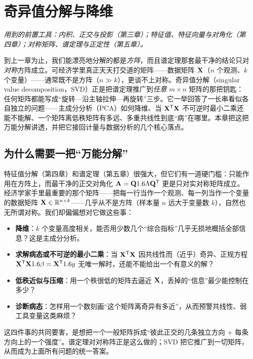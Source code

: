 \chapter{奇异值分解与降维}
\label{ch:svd}

\noindent\emph{用到的前置工具：内积、正交与投影（第三章）；特征值、特征向量与对角化（第四章）；对称矩阵、谱定理与正定性（第五章）。}
\medskip

到上一章为止，我们能漂亮地分解的都是\emph{方阵}，而且谱定理那套最干净的结论只对\emph{对称}方阵成立。可经济学里真正天天打交道的矩阵——数据矩阵 $\mathbf{X}$（$n$ 个观测、$k$ 个变量）——通常既不是方阵（$n\gg k$），更谈不上对称。奇异值分解（singular value decomposition，SVD）正是把谱定理推广到\emph{任意} $m\times n$ 矩阵的那把钥匙：任何矩阵都能写成``旋转—沿主轴拉伸—再旋转''三步。它一举回答了一长串看似各自独立的问题——主成分分析（PCA）如何降维、当 $\mathbf{X}^{\mathsf{T}}\mathbf{X}$ 不可逆时最小二乘还能不能解、一个矩阵离低秩矩阵有多远、多重共线性到底``病''在哪里。本章把这把万能分解讲透，并把它接回计量与数据分析的几个核心落点。

\section{为什么需要一把``万能分解''}
\label{sec:svd-motivation}

特征值分解（第四章）和谱定理（第五章）很强大，但它们有一道硬门槛：只能作用在方阵上，而最干净的正交对角化 $\mathbf{A}=\mathbf{Q}1.6\Lambda\mathbf{Q}^{\mathsf{T}}$ 更是只对实对称矩阵成立。经济学家手里最重要的那个矩阵——把每一行当作一个观测、每一列当作一个变量的数据矩阵 $\mathbf{X}\in\mathbb{R}^{n\times k}$——几乎从不是方阵（样本量 $n$ 远大于变量数 $k$），自然也无所谓对称。我们却偏偏想对它做这些事：

\begin{itemize}
    \item \textbf{降维}：$k$ 个变量高度相关，能否用少数几个``综合指标''几乎无损地概括全部信息？这是主成分分析。
    \item \textbf{求解病态或不可逆的最小二乘}：当 $\mathbf{X}^{\mathsf{T}}\mathbf{X}$ 因共线性而（近乎）奇异、正规方程 $\mathbf{X}^{\mathsf{T}}\mathbf{X}1.6\beta=\mathbf{X}^{\mathsf{T}}1.6 y$ 无唯一解时，还能不能给出一个有意义的解？
    \item \textbf{低秩近似与压缩}：用一个秩很低的矩阵去逼近 $\mathbf{X}$，丢掉的``信息''最少能控制在多少？
    \item \textbf{诊断病态}：怎样用一个数刻画``这个矩阵离奇异有多近''，从而预警共线性、弱工具变量这类麻烦？
\end{itemize}

这四件事的共同要害，是想把一个一般矩阵拆成``彼此正交的几条独立方向 + 每条方向上的一个强度''。谱定理对对称阵正是这么做的；SVD 把它推广到一切矩阵，从而成为上面所有问题的统一答案。

